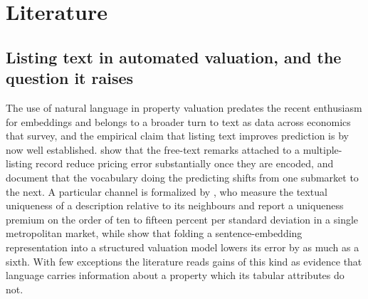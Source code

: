\documentclass{article}
\begin{document}
\section{Literature}
\label{sec:related}

\subsection{Listing text in automated valuation, and the question it raises}
\label{sec:related_disparities}

The use of natural language in property valuation predates the recent enthusiasm for embeddings and belongs to a broader turn to text as data across economics that \citet{gentzkow2019text} survey, and the empirical claim that listing text improves prediction is by now well established. \citet{nowak2017textual} show that the free-text remarks attached to a multiple-listing record reduce pricing error substantially once they are encoded, and \citet{nowak2021dictionaries} document that the vocabulary doing the predicting shifts from one submarket to the next. A particular channel is formalized by \citet{shen2021information}, who measure the textual uniqueness of a description relative to its neighbours and report a uniqueness premium on the order of ten to fifteen percent per standard deviation in a single metropolitan market, while \citet{baur2023automated} show that folding a sentence-embedding representation into a structured valuation model lowers its error by as much as a sixth. With few exceptions the literature reads gains of this kind as evidence that language carries information about a property which its tabular attributes do not.
\end{document}
